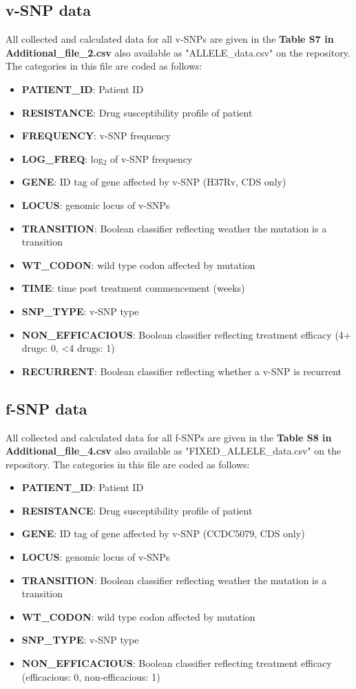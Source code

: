 \documentclass[12pt, oneside]{article}   	%
\begin{document}
\subsection{v-SNP data}
All collected and calculated data for all v-SNPs are given in the \textbf{Table S7 in Additional\_file\_2.csv} also available as "ALLELE\_data.csv" on the repository.
The categories in this file are coded as follows:
\begin{itemize}
\item \textbf{PATIENT\_ID}: Patient ID
\item \textbf{RESISTANCE}:  Drug susceptibility profile of patient
\item \textbf{FREQUENCY}: v-SNP frequency
\item \textbf{LOG\_FREQ}: log$_2$ of v-SNP frequency
\item \textbf{GENE}: ID tag of gene affected by v-SNP (H37Rv, CDS only)
\item \textbf{LOCUS}:  genomic locus of v-SNPs
\item \textbf{TRANSITION}: Boolean classifier reflecting weather the mutation is a transition
\item \textbf{WT\_CODON}: wild type codon affected by mutation
\item \textbf{TIME}: time post treatment commencement (weeks)
\item \textbf{SNP\_TYPE}: v-SNP type
\item \textbf{NON\_EFFICACIOUS}: Boolean classifier reflecting treatment efficacy (4+ drugs: 0, <4 drugs: 1)
\item \textbf{RECURRENT}: Boolean classifier reflecting whether a v-SNP is recurrent
\end{itemize}

\subsection{f-SNP data}
All collected and calculated data for all f-SNPs are given in the \textbf{Table S8 in Additional\_file\_4.csv} also available as "FIXED\_ALLELE\_data.csv" on the repository.
The categories in this file are coded as follows:
\begin{itemize}
\item \textbf{PATIENT\_ID}: Patient ID
\item \textbf{RESISTANCE}: Drug susceptibility profile of patient
\item \textbf{GENE}: ID tag of gene affected by v-SNP (CCDC5079, CDS only)
\item \textbf{LOCUS}:  genomic locus of v-SNPs
\item \textbf{TRANSITION}: Boolean classifier reflecting weather the mutation is a transition
\item \textbf{WT\_CODON}: wild type codon affected by mutation
\item \textbf{SNP\_TYPE}: v-SNP type
\item \textbf{NON\_EFFICACIOUS}: Boolean classifier reflecting treatment efficacy (efficacious: 0, non-efficacious: 1)
\end{itemize}
\end{document}
